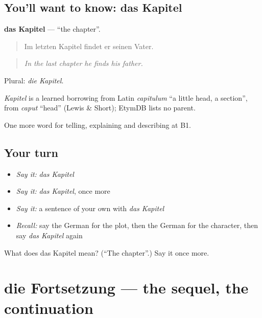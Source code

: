 \subsection*{You'll want to know: das Kapitel}
\textbf{das Kapitel} — \textquotedblleft{}the chapter\textquotedblright{}.

\begin{quote}
Im letzten Kapitel findet er seinen Vater.
\end{quote}

\begin{quote}
\emph{In the last chapter he finds his father.}
\end{quote}

Plural: \emph{die Kapitel}.

\begin{cousinweb}
\emph{Kapitel} is a learned borrowing from Latin \emph{capitulum} \textquotedblleft{}a little head, a section\textquotedblright{}, from \emph{caput} \textquotedblleft{}head\textquotedblright{} (Lewis \& Short); EtymDB lists no parent.
\end{cousinweb}

\begin{grammarlens}[title={What you've built}]
One more word for telling, explaining and describing at B1.
\end{grammarlens}

\subsection*{Your turn}
\begin{itemize}
\raggedright
  \item \emph{Say it:} \emph{das Kapitel}
  \item \emph{Say it:} \emph{das Kapitel}, once more
  \item \emph{Say it:} a sentence of your own with \emph{das Kapitel}
  \item \emph{Recall:} say the German for the plot, then the German for the character, then say \emph{das Kapitel} again
\end{itemize}

\begin{tcolorbox}[breakable,colback=teal!4,colframe=teal!35!black,title={Before you move on}]
What does das Kapitel mean? (\textquotedblleft{}The chapter\textquotedblright{}.) Say it once more.
\end{tcolorbox}
\section[die Fortsetzung]{die Fortsetzung — the sequel, the continuation}

